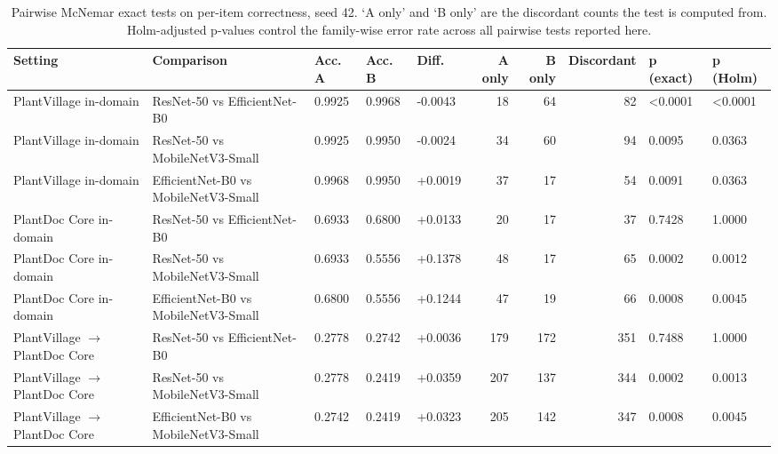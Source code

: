 \begin{table}[htbp]
\caption{Pairwise McNemar exact tests on per-item correctness, seed 42. `A only' and `B only' are the discordant counts the test is computed from. Holm-adjusted p-values control the family-wise error rate across all pairwise tests reported here.}
\label{tab:mcnemar}
\begin{tabular}{lllllrrrll}
\toprule
Setting & Comparison & Acc. A & Acc. B & Diff. & A only & B only & Discordant & p (exact) & p (Holm) \\
\midrule
PlantVillage in-domain & ResNet-50 vs EfficientNet-B0 & 0.9925 & 0.9968 & -0.0043 & 18 & 64 & 82 & <0.0001 & <0.0001 \\
PlantVillage in-domain & ResNet-50 vs MobileNetV3-Small & 0.9925 & 0.9950 & -0.0024 & 34 & 60 & 94 & 0.0095 & 0.0363 \\
PlantVillage in-domain & EfficientNet-B0 vs MobileNetV3-Small & 0.9968 & 0.9950 & +0.0019 & 37 & 17 & 54 & 0.0091 & 0.0363 \\
PlantDoc Core in-domain & ResNet-50 vs EfficientNet-B0 & 0.6933 & 0.6800 & +0.0133 & 20 & 17 & 37 & 0.7428 & 1.0000 \\
PlantDoc Core in-domain & ResNet-50 vs MobileNetV3-Small & 0.6933 & 0.5556 & +0.1378 & 48 & 17 & 65 & 0.0002 & 0.0012 \\
PlantDoc Core in-domain & EfficientNet-B0 vs MobileNetV3-Small & 0.6800 & 0.5556 & +0.1244 & 47 & 19 & 66 & 0.0008 & 0.0045 \\
PlantVillage $\rightarrow$ PlantDoc Core & ResNet-50 vs EfficientNet-B0 & 0.2778 & 0.2742 & +0.0036 & 179 & 172 & 351 & 0.7488 & 1.0000 \\
PlantVillage $\rightarrow$ PlantDoc Core & ResNet-50 vs MobileNetV3-Small & 0.2778 & 0.2419 & +0.0359 & 207 & 137 & 344 & 0.0002 & 0.0013 \\
PlantVillage $\rightarrow$ PlantDoc Core & EfficientNet-B0 vs MobileNetV3-Small & 0.2742 & 0.2419 & +0.0323 & 205 & 142 & 347 & 0.0008 & 0.0045 \\
\bottomrule
\end{tabular}
\end{table}
